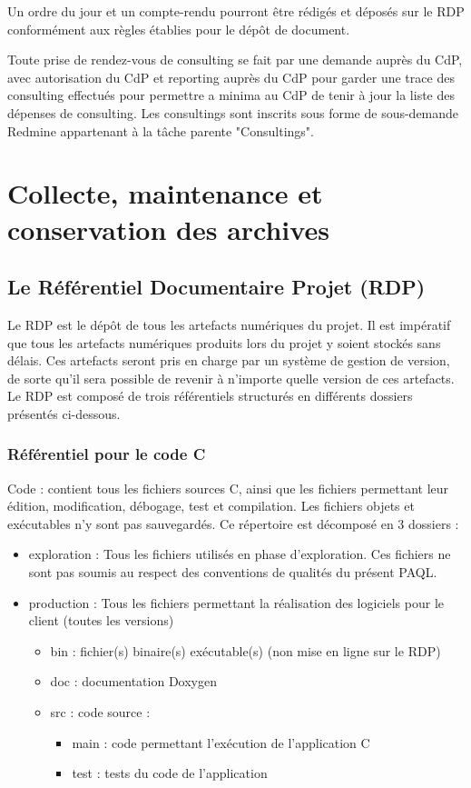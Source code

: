\documentclass[a4paper,11pt,titlepage]{article}
\begin{document}
Un ordre du jour et un compte-rendu
pourront être rédigés et déposés sur le RDP conformément aux règles établies
pour le dépôt de document.

Toute prise de rendez-vous de consulting se fait par une demande auprès
du CdP,  avec autorisation du CdP et reporting auprès du CdP pour garder
une trace des consulting effectués pour permettre a minima au CdP de
tenir à jour la liste des dépenses de consulting. Les consultings sont inscrits sous forme de sous-demande Redmine
appartenant à la tâche parente "Consultings". \\

\section{Collecte, maintenance et conservation des archives}
\subsection{Le Référentiel Documentaire Projet (RDP)}
Le RDP est le dépôt de tous les artefacts numériques du projet. Il
est impératif que tous les artefacts numériques produits lors du
projet y soient stockés sans délais. Ces artefacts seront pris en
charge par un système de gestion de version, de sorte qu'il sera
possible de revenir à n'importe quelle version de ces artefacts.
Le RDP est composé de trois référentiels structurés en différents dossiers présentés ci-dessous.

\subsubsection{Référentiel pour le code C}
Code : contient tous les fichiers sources C, ainsi que les fichiers permettant leur édition,
modification, débogage, test et compilation. Les fichiers objets et exécutables n'y sont pas
sauvegardés. Ce répertoire est décomposé en 3 dossiers :
\begin{itemize}
    \item exploration : Tous les fichiers utilisés en phase d'exploration.
          Ces fichiers ne sont pas soumis au respect des
          conventions de qualités du présent PAQL.
    \item production : Tous les fichiers permettant la réalisation
          des logiciels pour le client (toutes les versions)
          \begin{itemize}
              \item bin : fichier(s) binaire(s) exécutable(s) (non mise en ligne sur le RDP)
              \item doc : documentation Doxygen
              \item src : code source :
                    \begin{itemize}
                        \item main : code permettant l'exécution de l'application C
                        \item test : tests du code de l'application
                    \end{itemize}
          \end{itemize}
\end{itemize}
\end{document}
